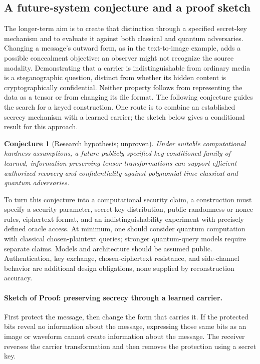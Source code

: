 \documentclass[10pt]{article}
\newtheorem{conjecture}{Conjecture}
\begin{document}
\subsection{A future-system conjecture and a proof sketch}
The longer-term aim is to create that distinction through a specified secret-key
mechanism and to evaluate it against both classical and quantum adversaries.
Changing a message's outward form, as in the text-to-image example, adds a
possible concealment objective: an observer might not recognize the source
modality. Demonstrating that a carrier is indistinguishable from ordinary media
is a steganographic question, distinct from whether its hidden content is
cryptographically confidential. Neither property follows from representing the
data as a tensor or from changing its file format.
The following conjecture guides the search for a keyed construction. One route
is to combine an established secrecy mechanism with a learned carrier; the
sketch below gives a conditional result for this approach.
\begin{conjecture}[Research hypothesis; unproven]
Under suitable computational hardness assumptions, a future publicly specified
key-conditioned family of learned, information-preserving tensor transformations
can support efficient authorized recovery and confidentiality against
polynomial-time classical and quantum adversaries.
\end{conjecture}
To turn this conjecture into a computational security claim, a construction
must specify a security parameter,
secret-key distribution, public randomness or nonce rules, ciphertext format,
and an indistinguishability experiment with precisely defined oracle access.
At minimum, one should consider quantum computation with classical
chosen-plaintext queries; stronger quantum-query models require separate claims.
Models and architecture should be assumed public. Authentication, key exchange,
chosen-ciphertext resistance, and side-channel behavior are additional design
obligations, none supplied by reconstruction accuracy.

\paragraph{Sketch of Proof: preserving secrecy through a learned carrier.}
First protect the message, then change the form that carries it. If the protected
bits reveal no information about the message, expressing those same bits as an
image or waveform cannot create information about the message. The receiver
reverses the carrier transformation and then removes the protection using a
secret key.
\end{document}
